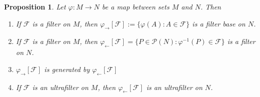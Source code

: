 \documentclass[12pt]{article}
\newtheorem{proposition}[theorem]{Proposition}
\begin{document}
\begin{proposition}\label{PrImageAndPreimageOfAFilter} Let $\varphi:M\to N$ be a
    map between sets $M$ and $N$. Then
    \begin{enumerate}[label = (\roman*)]
        \item If $\mathcal{F}$ is a filter on $M$, then
              $\varphi_{\rightarrow}[\mathcal{F}]
                  :=\{\varphi(A):A\in\mathcal{F}\}$
              is a filter base on $N$.
        \item If $\mathcal{F}$ is a filter on $M$, then
              $\varphi_{\leftarrow}[\mathcal{F}]=
                  \{P\in\mathcal{P}(N):\varphi^{-1}(P)\in\mathcal{F}\}$
              is a filter on $N$.
        \item $\varphi_{\rightarrow}[\mathcal{F}]$ is generated by
              $\varphi_{\leftarrow}[\mathcal{F}]$
        \item If $\mathcal{F}$ is an ultrafilter on $M$, then
              $\varphi_{\leftarrow}[\mathcal{F}]$ is an ultrafilter on $N$.
    \end{enumerate}
\end{proposition}
\end{document}

